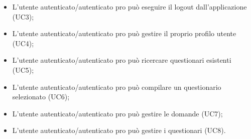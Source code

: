 \begin{itemize}
\begin{itemize}
\item L'utente autenticato/autenticato pro può eseguire il logout dall'applicazione (UC3); 
\item L'utente autenticato/autenticato pro può gestire il proprio profilo utente (UC4);
\item L'utente autenticato/autenticato pro può ricercare questionari esistenti (UC5);
\item L'utente autenticato/autenticato pro può compilare un questionario  selezionato (UC6);
\item L'utente autenticato/autenticato pro può gestire le domande (UC7);
\item L'utente autenticato/autenticato pro può gestire i questionari (UC8).
\end{itemize}
\end{itemize}